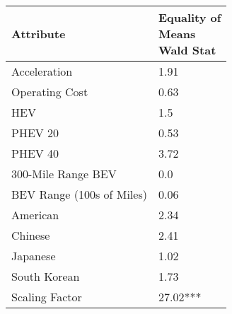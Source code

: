 \begin{tabular}{ll}
\toprule
                Attribute & \makecell{Equality of \\ Means \\ Wald Stat} \\
\midrule
             Acceleration &                        \multirow{1}{*}{1.91} \\
           Operating Cost &                        \multirow{1}{*}{0.63} \\
                      HEV &                         \multirow{1}{*}{1.5} \\
                  PHEV 20 &                        \multirow{1}{*}{0.53} \\
                  PHEV 40 &                        \multirow{1}{*}{3.72} \\
       300-Mile Range BEV &                         \multirow{1}{*}{0.0} \\
BEV Range (100s of Miles) &                        \multirow{1}{*}{0.06} \\
                 American &                        \multirow{1}{*}{2.34} \\
                  Chinese &                        \multirow{1}{*}{2.41} \\
                 Japanese &                        \multirow{1}{*}{1.02} \\
             South Korean &                        \multirow{1}{*}{1.73} \\
           Scaling Factor &                    \multirow{1}{*}{27.02***} \\
\bottomrule
\end{tabular}
